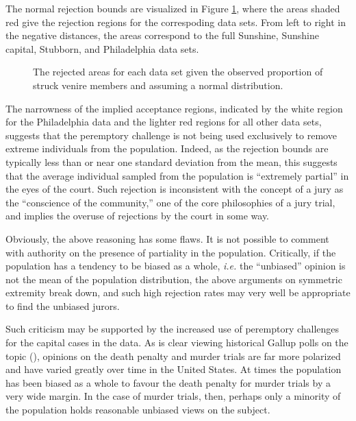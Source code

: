 The normal rejection bounds are visualized in Figure \ref{fig:rejbnds}, where the areas shaded red give the rejection regions for
the correspoding data sets. From left to right in the negative distances, the areas correspond to the full Sunshine, Sunshine
capital, Stubborn, and Philadelphia data sets.

\begin{figure}[h!]
  \centering
  \caption[Normal Rejection Boundaries Visualized]{\footnotesize The rejected areas for each data set given the observed
    proportion of struck venire members and assuming a normal distribution.}
  \label{fig:rejbnds}
\end{figure}

The narrowness of the implied acceptance regions, indicated by the white region for the Philadelphia data and the lighter red
regions for all other data sets, suggests that the peremptory challenge is not being used exclusively to remove extreme
individuals from the population. Indeed, as the rejection bounds are typically less than or near one standard deviation from the
mean, this suggests that the average individual sampled from the population is ``extremely partial'' in the eyes of the
court. Such rejection is inconsistent with the concept of a jury as the ``conscience of the community,'' one of the core
philosophies of a jury trial, and implies the overuse of rejections by the court in some way.

Obviously, the above reasoning has some flaws. It is not possible to comment with authority on the presence of partiality in the
population. Critically, if the population has a tendency to be biased as a whole, \textit{i.e.} the ``unbiased'' opinion is not
the mean of the population distribution, the above arguments on symmetric extremity break down, and such high rejection rates may
very well be appropriate to find the unbiased jurors.

Such criticism may be supported by the increased use of peremptory challenges for the capital cases in the data. As is clear
viewing historical Gallup polls on the topic (\cite{gallupdeath}), opinions on the death penalty and murder trials are far more
polarized and have varied greatly over time in the United States. At times the population has been biased as a whole to favour the
death penalty for murder trials by a very wide margin. In the case of murder trials, then, perhaps only a minority of the
population holds reasonable unbiased views on the subject.


